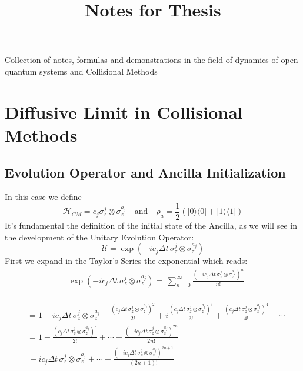\documentclass[a4paper,12pt]{article}
\begin{document}
	\title{\textbf{Notes for Thesis}}
	\maketitle

	\begin{center}
		Collection of notes, formulas and demonstrations in the field of dynamics of open quantum systems and Collisional Methods
	\end{center}

	\section{Diffusive Limit in Collisional Methods}

	\subsection{Evolution Operator and Ancilla Initialization}
	In this case we define \begin{equation} 
		\mathcal{H}_{CM} = c_{j} \sigma_{z}^{j} \otimes \sigma_{z}^{a_j} \quad \text{and} \quad \rho_{a} = \frac{1}{2}\left( |0\rangle \langle0| + |1\rangle \langle1| \right)
		\end{equation}
	It's fundamental the definition of the initial state of the Ancilla, as we will see in the development of the Unitary Evolution Operator: 
	\begin{equation}
		\mathcal{U} = \exp{\left( -i c_j \Delta t \, \sigma_{z}^{j} \otimes \sigma_{z}^{a_j} \right)}
	\end{equation}
	First we expand in the Taylor's Series the exponential which reads:
	\begin{equation}
	\begin{aligned}
		&\exp{\left( -i c_j \Delta t \, \sigma_{z}^{j} \otimes \sigma_{z}^{a_j} \right)} = \, \sum_{n=0}^{\infty}{\frac{\left( -i c_j \Delta t \, \sigma_{z}^{j} \otimes \sigma_{z}^{a_j} \right)^n}{n!} } \\
	\end{aligned}
	\end{equation}
		
	\begin{align*}
		&= 1 - i c_j \Delta t \, \sigma_{z}^{j} \otimes \sigma_{z}^{a_j} - \frac{\left( c_j \Delta t \, \sigma_{z}^{j} \otimes \sigma_{z}^{a_j} \right)^2}{2!} + i \frac{\left( c_j \Delta t \, \sigma_{z}^{j} \otimes \sigma_{z}^{a_j} \right)^3}{3!} + \frac{\left( c_j \Delta t \, \sigma_{z}^{j} \otimes \sigma_{z}^{a_j} \right)^4}{4!} + \cdots  \\
		&=1 - \frac{\left( c_j \Delta t \, \sigma_{z}^{j} \otimes \sigma_{z}^{a_j} \right)^2}{2!} + \cdots  + \frac{\left( -i c_j \Delta t \, \sigma_{z}^{j} \otimes \sigma_{z}^{a_j} \right)^{{2n}}}{2n!}  \\
		&\,- i c_j\Delta t \, \sigma_{z}^{j} \otimes \sigma_{z}^{a_j} + \cdots  + \frac{\left( -i c_j \Delta t \, \sigma_{z}^{j} \otimes \sigma_{z}^{a_j} \right)^{{2n+1}}}{(2n+1)!} \\ 
	\end{align*}
\end{document}
